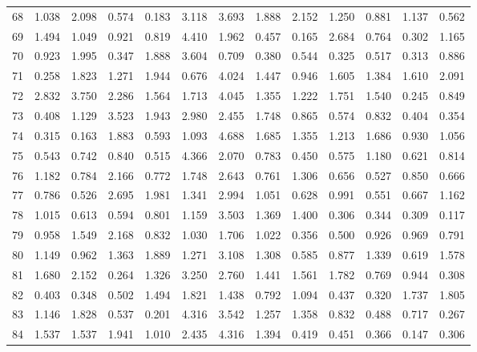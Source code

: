 \begin{tabular}{lrrrrrrrrrrrr}
68  &  1.038 &  2.098 &  0.574 &  0.183 &  3.118 &  3.693 &  1.888 &  2.152 &  1.250 &  0.881 &  1.137 &  0.562 \\
69  &  1.494 &  1.049 &  0.921 &  0.819 &  4.410 &  1.962 &  0.457 &  0.165 &  2.684 &  0.764 &  0.302 &  1.165 \\
70  &  0.923 &  1.995 &  0.347 &  1.888 &  3.604 &  0.709 &  0.380 &  0.544 &  0.325 &  0.517 &  0.313 &  0.886 \\
71  &  0.258 &  1.823 &  1.271 &  1.944 &  0.676 &  4.024 &  1.447 &  0.946 &  1.605 &  1.384 &  1.610 &  2.091 \\
72  &  2.832 &  3.750 &  2.286 &  1.564 &  1.713 &  4.045 &  1.355 &  1.222 &  1.751 &  1.540 &  0.245 &  0.849 \\
73  &  0.408 &  1.129 &  3.523 &  1.943 &  2.980 &  2.455 &  1.748 &  0.865 &  0.574 &  0.832 &  0.404 &  0.354 \\
74  &  0.315 &  0.163 &  1.883 &  0.593 &  1.093 &  4.688 &  1.685 &  1.355 &  1.213 &  1.686 &  0.930 &  1.056 \\
75  &  0.543 &  0.742 &  0.840 &  0.515 &  4.366 &  2.070 &  0.783 &  0.450 &  0.575 &  1.180 &  0.621 &  0.814 \\
76  &  1.182 &  0.784 &  2.166 &  0.772 &  1.748 &  2.643 &  0.761 &  1.306 &  0.656 &  0.527 &  0.850 &  0.666 \\
77  &  0.786 &  0.526 &  2.695 &  1.981 &  1.341 &  2.994 &  1.051 &  0.628 &  0.991 &  0.551 &  0.667 &  1.162 \\
78  &  1.015 &  0.613 &  0.594 &  0.801 &  1.159 &  3.503 &  1.369 &  1.400 &  0.306 &  0.344 &  0.309 &  0.117 \\
79  &  0.958 &  1.549 &  2.168 &  0.832 &  1.030 &  1.706 &  1.022 &  0.356 &  0.500 &  0.926 &  0.969 &  0.791 \\
80  &  1.149 &  0.962 &  1.363 &  1.889 &  1.271 &  3.108 &  1.308 &  0.585 &  0.877 &  1.339 &  0.619 &  1.578 \\
81  &  1.680 &  2.152 &  0.264 &  1.326 &  3.250 &  2.760 &  1.441 &  1.561 &  1.782 &  0.769 &  0.944 &  0.308 \\
82  &  0.403 &  0.348 &  0.502 &  1.494 &  1.821 &  1.438 &  0.792 &  1.094 &  0.437 &  0.320 &  1.737 &  1.805 \\
83  &  1.146 &  1.828 &  0.537 &  0.201 &  4.316 &  3.542 &  1.257 &  1.358 &  0.832 &  0.488 &  0.717 &  0.267 \\
84  &  1.537 &  1.537 &  1.941 &  1.010 &  2.435 &  4.316 &  1.394 &  0.419 &  0.451 &  0.366 &  0.147 &  0.306 \\

\end{tabular}
